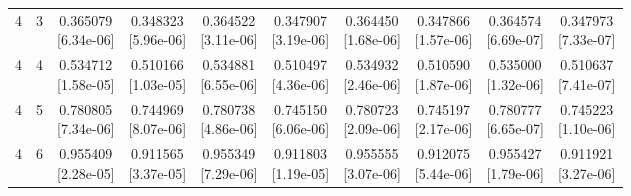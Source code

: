 \documentclass[12pt,letterpaper]{article}
\theoremstyle{plain}
\theoremstyle{definition}
\begin{document}
\begin{table}[p]
\begin{adjustbox}{max width=\linewidth}
\begin{tabular}{@{}rr*{8}{c}@{}}
4 & 3 & \shortstack{0.365079\\[-1pt]{\scriptsize[6.34e-06]}} & \shortstack{0.348323\\[-1pt]{\scriptsize[5.96e-06]}} & \shortstack{0.364522\\[-1pt]{\scriptsize[3.11e-06]}} & \shortstack{0.347907\\[-1pt]{\scriptsize[3.19e-06]}} & \shortstack{0.364450\\[-1pt]{\scriptsize[1.68e-06]}} & \shortstack{0.347866\\[-1pt]{\scriptsize[1.57e-06]}} & \shortstack{0.364574\\[-1pt]{\scriptsize[6.69e-07]}} & \shortstack{0.347973\\[-1pt]{\scriptsize[7.33e-07]}}\\
4 & 4 & \shortstack{0.534712\\[-1pt]{\scriptsize[1.58e-05]}} & \shortstack{0.510166\\[-1pt]{\scriptsize[1.03e-05]}} & \shortstack{0.534881\\[-1pt]{\scriptsize[6.55e-06]}} & \shortstack{0.510497\\[-1pt]{\scriptsize[4.36e-06]}} & \shortstack{0.534932\\[-1pt]{\scriptsize[2.46e-06]}} & \shortstack{0.510590\\[-1pt]{\scriptsize[1.87e-06]}} & \shortstack{0.535000\\[-1pt]{\scriptsize[1.32e-06]}} & \shortstack{0.510637\\[-1pt]{\scriptsize[7.41e-07]}}\\
4 & 5 & \shortstack{0.780805\\[-1pt]{\scriptsize[7.34e-06]}} & \shortstack{0.744969\\[-1pt]{\scriptsize[8.07e-06]}} & \shortstack{0.780738\\[-1pt]{\scriptsize[4.86e-06]}} & \shortstack{0.745150\\[-1pt]{\scriptsize[6.06e-06]}} & \shortstack{0.780723\\[-1pt]{\scriptsize[2.09e-06]}} & \shortstack{0.745197\\[-1pt]{\scriptsize[2.17e-06]}} & \shortstack{0.780777\\[-1pt]{\scriptsize[6.65e-07]}} & \shortstack{0.745223\\[-1pt]{\scriptsize[1.10e-06]}}\\
4 & 6 & \shortstack{0.955409\\[-1pt]{\scriptsize[2.28e-05]}} & \shortstack{0.911565\\[-1pt]{\scriptsize[3.37e-05]}} & \shortstack{0.955349\\[-1pt]{\scriptsize[7.29e-06]}} & \shortstack{0.911803\\[-1pt]{\scriptsize[1.19e-05]}} & \shortstack{0.955555\\[-1pt]{\scriptsize[3.07e-06]}} & \shortstack{0.912075\\[-1pt]{\scriptsize[5.44e-06]}} & \shortstack{0.955427\\[-1pt]{\scriptsize[1.79e-06]}} & \shortstack{0.911921\\[-1pt]{\scriptsize[3.27e-06]}}\\

\end{tabular}
\end{adjustbox}
\end{table}
\end{document}
